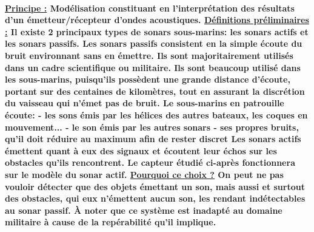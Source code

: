 \documentclass[a4paper,11pt]{article}
\begin{document}
\paragraph{\normalfont \textbf{\underline{Principe :}} \newline \newline Mod\'{e}lisation constituant en l'interpr\'{e}tation des r\'{e}sultats d'un \'{e}metteur/r\'{e}cepteur d'ondes acoustiques. \newline \newline
\textbf{\underline{D\'{e}finitions pr\'{e}liminaires :}} \newline \newline Il existe 2 principaux types de sonars sous-marins: les sonars \textbf{actifs} et les sonars \textbf{passifs.}\newline \newline
Les \textbf{sonars passifs} consistent en la simple \'{e}coute du bruit environnant sans en \'{e}mettre. Ils sont majoritairement utilis\'{e}s dans un cadre scientifique ou militaire. Ils sont beaucoup utilis\'{e} dans les sous-marins, puisqu'ils poss\`{e}dent une grande distance d'\'{e}coute, portant sur des centaines de kilom\`{e}tres, tout en assurant la discr\'{e}tion du vaisseau qui n'\'{e}met pas de bruit. Le sous-marins en patrouille \'{e}coute:\newline
- les sons \'{e}mis par les h\'{e}lices des autres bateaux, les coques en mouvement...  \newline
- le son \'{e}mis par les autres sonars\newline
- ses propres bruits, qu'il doit r\'{e}duire au maximum afin de rester discret\newline \newline
Les \textbf{sonars actifs} \'{e}mettent quant \`{a} eux des signaux et \'{e}coutent leur \'{e}chos sur les obstacles qu'ils rencontrent.\newline \newline
Le capteur \'{e}tudi\'{e} ci-apr\`{e}s \textbf{fonctionnera sur le mod\`{e}le du sonar actif}. \newline \newline
\textbf{\underline{Pourquoi ce choix ?}} \newline On peut ne pas vouloir d\'{e}tecter que des objets \'{e}mettant un son, mais \textbf{aussi et surtout} des obstacles, qui eux n'\'{e}mettent aucun son, les rendant ind\'{e}tectables au sonar passif. \`{A} noter que ce syst\`{e}me est inadapt\'{e} au domaine militaire \`{a} cause de la \textbf{rep\'{e}rabilit\'{e}} qu'il implique. \newline \newline
}
\end{document}
